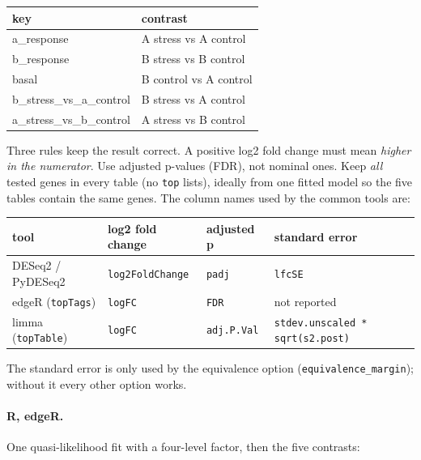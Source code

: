 \documentclass[11pt,a4paper]{article}
\newcommand{\code}[1]{\texttt{\color{navy!85!black}#1}}
\begin{document}
\begin{center}
\small
\begin{tabular}{>{\ttfamily}l l}
\toprule
\textsf{\textbf{key}} & \textsf{\textbf{contrast}}\\
\midrule
a\_response & A stress vs A control\\
b\_response & B stress vs B control\\
basal & B control vs A control\\
b\_stress\_vs\_a\_control & B stress vs A control\\
a\_stress\_vs\_b\_control & A stress vs B control\\
\bottomrule
\end{tabular}
\end{center}

Three rules keep the result correct. A positive log2 fold change must mean \emph{higher in the numerator}.
Use adjusted p-values (FDR), not nominal ones. Keep \emph{all} tested genes in every table (no
\code{top} lists), ideally from one fitted model so the five tables contain the same genes. The column
names used by the common tools are:

\begin{center}
\small
\begin{tabular}{l l l l}
\toprule
\textsf{\textbf{tool}} & \textsf{\textbf{log2 fold change}} & \textsf{\textbf{adjusted p}} & \textsf{\textbf{standard error}}\\
\midrule
DESeq2 / PyDESeq2 & \code{log2FoldChange} & \code{padj} & \code{lfcSE}\\
edgeR (\code{topTags}) & \code{logFC} & \code{FDR} & not reported\\
limma (\code{topTable}) & \code{logFC} & \code{adj.P.Val} & \code{stdev.unscaled * sqrt(s2.post)}\\
\bottomrule
\end{tabular}
\end{center}

The standard error is only used by the equivalence option (\code{equivalence\_margin}); without it every
other option works.

\paragraph{R, edgeR.} One quasi-likelihood fit with a four-level factor, then the five contrasts:
\end{document}
